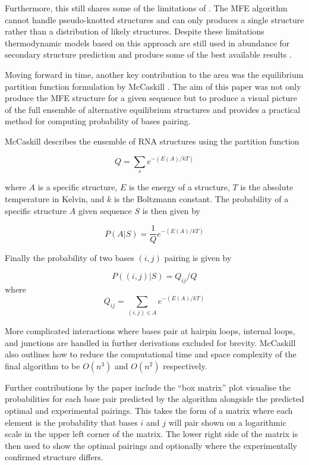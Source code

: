 \documentclass[journal]{IEEEtran}
\begin{document}
Furthermore, this still shares some of the limitations of \cite{nussinov1980fast}. The MFE algorithm cannot handle pseudo-knotted structures and can only produces a single structure rather than a distribution of likely structures. Despite these limitations thermodynamic models based on this approach are still used in abundance for secondary structure prediction and produce some of the best available results \cite{laing2010computational} \cite{rivas2013four}.

Moving forward in time, another key contribution to the area was the equilibrium partition function formulation by McCaskill \cite{mccaskill1990equilibrium}. The aim of this paper was not only produce the MFE structure for a given sequence but to produce a visual picture of the full ensemble of alternative equilibrium structures and provides a practical method for computing probability of bases pairing. 

McCaskill describes the ensemble of RNA structures using the partition function

\begin{equation}
	Q = \sum_s e^{-(E(A)/kT)}
\end{equation} 

where $A$ is a specific structure, $E$ is the energy of a structure, $T$ is the absolute temperature in Kelvin, and $k$ is the Boltzmann constant. The probability of a specific structure $A$ given sequence $S$ is then given by

\begin{equation}
	P(A|S) = \frac{1}{Q} e^{-(E(A)/kT)}	
\end{equation}

Finally the probability of two bases $(i, j)$ pairing is given by

\begin{equation}
	P((i,j)|S) = Q_{ij} / Q
\end{equation}
where
\begin{equation}
	Q_{ij} = \sum_{(i,j) \in A} e^{-(E(A)/kT)}
\end{equation}

More complicated interactions where bases pair at hairpin loops, internal loops, and junctions are handled in further derivations excluded for brevity. McCaskill also outlines how to reduce the computational time and space complexity of the final algorithm to be $O(n^3)$ and $O(n^2)$ respectively.

Further contributions by the paper include the ``box matrix'' plot visualise the probabilities for each base pair predicted by the algorithm alongside the predicted optimal and experimental pairings. This takes the form of a matrix where each element is the probability that bases $i$ and $j$ will pair shown on a logarithmic scale in the upper left corner of the matrix. The lower right side of the matrix is then used to show the optimal pairings and optionally where the experimentally confirmed structure differs. 
\end{document}
